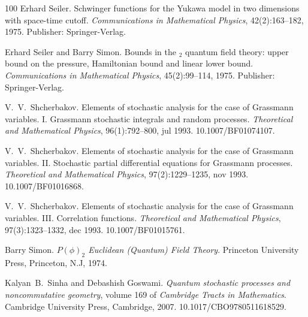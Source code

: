 \documentclass{article}
\newcommand{\tmrsub}[1]{\ensuremath{_{\textrm{#1}}}}
\newcommand{\tmtextit}[1]{{\itshape{#1}}}
\begin{document}
\begin{thebibliography}{100}
  Erhard Seiler. {\newblock}Schwinger
  functions for the Yukawa model in two dimensions with space-time cutoff.
  {\newblock}\tmtextit{Communications in Mathematical Physics},
  42(2):163--182, 1975. {\newblock}Publisher: Springer-Verlag.{\newblock}
  
  Erhard Seiler  and  Barry Simon.
  {\newblock}Bounds in the \tmrsub{$2$} quantum field theory:
  upper bound on the pressure, Hamiltonian bound and linear lower bound.
  {\newblock}\tmtextit{Communications in Mathematical Physics}, 45(2):99--114,
  1975. {\newblock}Publisher: Springer-Verlag.{\newblock}
  
  V.~V.~Shcherbakov.
  {\newblock}Elements of stochastic analysis for the case of Grassmann
  variables. I. Grassmann stochastic integrals and random processes.
  {\newblock}\tmtextit{Theoretical and Mathematical Physics}, 96(1):792--800,
  jul 1993.
  {\newblock}\href{Https://doi.org/10.1007/BF01074107}{}10.1007/BF01074107.{\newblock}
  
  V.~V.~Shcherbakov.
  {\newblock}Elements of stochastic analysis for the case of Grassmann
  variables. II. Stochastic partial differential equations for Grassmann
  processes. {\newblock}\tmtextit{Theoretical and Mathematical Physics},
  97(2):1229--1235, nov 1993.
  {\newblock}\href{Https://doi.org/10.1007/BF01016868}{}10.1007/BF01016868.{\newblock}
  
  V.~V.~Shcherbakov.
  {\newblock}Elements of stochastic analysis for the case of Grassmann
  variables. III. Correlation functions. {\newblock}\tmtextit{Theoretical and
  Mathematical Physics}, 97(3):1323--1332, dec 1993.
  {\newblock}\href{Https://doi.org/10.1007/BF01015761}{}10.1007/BF01015761.{\newblock}
  
  Barry Simon. {\newblock}\tmtextit{$P (\phi)_2$
  Euclidean (Quantum) Field Theory}. {\newblock}Princeton University Press,
  Princeton, N.J, 1974.{\newblock}
  
  Kalyan~B.~Sinha  and  Debashish Goswami.
  {\newblock}\tmtextit{Quantum stochastic processes and noncommutative
  geometry},  volume  169  of \tmtextit{Cambridge Tracts in Mathematics}.
  {\newblock}Cambridge University Press, Cambridge, 2007.
  {\newblock}\href{Https://doi.org/10.1017/CBO9780511618529}{}10.1017/CBO9780511618529.{\newblock}
  

\end{thebibliography}
\end{document}
